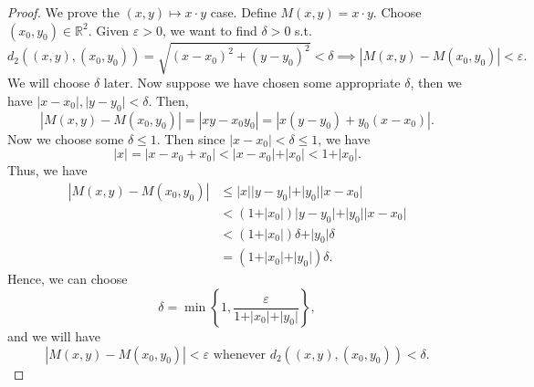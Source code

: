 \begin{proof}
    We prove the \((x, y) \mapsto x \cdot y\) case. Define \(M(x, y) = x \cdot y\). Choose \((x_0, y_0) \in \mathbb{R}^2 \). Given \(\varepsilon > 0\), we want to find \(\delta > 0\) s.t. 
    \[
        d_2 \left( (x, y), (x_0,y_0) \right) = \sqrt{(x - x_0)^2 + (y - y_0)^2}  < \delta \implies \left\vert M(x, y) - M(x_0, y_0) \right\vert < \varepsilon .  
    \] We will choose \(\delta \) later. Now suppose we have chosen some appropriate \(\delta \), then we have \(\vert x - x_0 \vert, \vert y - y_0 \vert < \delta  \). Then, 
    \[
        \left\vert M(x, y) - M(x_0, y_0) \right\vert = \left\vert xy - x_0 y_0 \right\vert = \left\vert x(y - y_0) + y_0(x - x_0) \right\vert. 
    \] Now we choose some \(\delta \le 1\). Then since \(\left\vert x - x_0 \right\vert < \delta \le 1\), we have
    \[
        \vert x \vert = \left\vert x - x_0 + x_0 \right\vert < \vert x - x_0 \vert + \vert x_0 \vert < 1 + \vert x_0 \vert.
    \] 
    Thus, we have 
    \begin{align*}
        \left\vert M(x, y) - M(x_0, y_0) \right\vert & \le \vert x \vert  \vert y - y_0 \vert + \vert y_0 \vert \vert x - x_0 \vert  \\
        & < (1 + \vert x_0 \vert ) \vert y - y_0 \vert + \vert y_0 \vert \vert x - x_0 \vert \\
        &< (1 + \vert x_0 \vert )\delta + \vert y_0 \vert \delta  \\
        &= (1 + \vert x_0 \vert + \vert y_0 \vert  ) \delta.   
    \end{align*}
    Hence, we can choose 
    \[
        \delta = \min \left\{ 1, \frac{\varepsilon }{1 + \vert x_0 \vert + \vert y_0 \vert } \right\},
    \] and we will have 
    \[
        \left\vert M(x, y) - M(x_0, y_0) \right\vert < \varepsilon \text{ whenever } d_2 \left( (x, y), (x_0, y_0) \right) < \delta  .  
    \] 
\end{proof}

